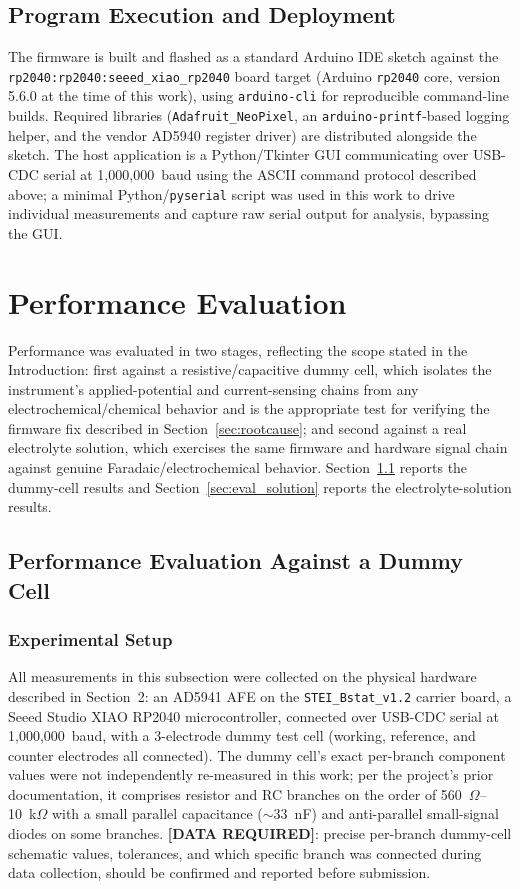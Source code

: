 \documentclass[preprint,12pt]{elsarticle}
\begin{document}
\subsection{Program Execution and Deployment}
The firmware is built and flashed as a standard Arduino IDE sketch against the \texttt{rp2040:rp2040:seeed\_xiao\_rp2040} board target (Arduino \texttt{rp2040} core, version 5.6.0 at the time of this work), using \texttt{arduino-cli} for reproducible command-line builds. Required libraries (\texttt{Adafruit\_NeoPixel}, an \texttt{arduino-printf}-based logging helper, and the vendor AD5940 register driver) are distributed alongside the sketch. The host application is a Python/Tkinter GUI communicating over USB-CDC serial at 1{,}000{,}000~baud using the ASCII command protocol described above; a minimal Python/\texttt{pyserial} script was used in this work to drive individual measurements and capture raw serial output for analysis, bypassing the GUI.

\section{Performance Evaluation}

Performance was evaluated in two stages, reflecting the scope stated in the Introduction: first against a resistive/capacitive dummy cell, which isolates the instrument's applied-potential and current-sensing chains from any electrochemical/chemical behavior and is the appropriate test for verifying the firmware fix described in Section~\ref{sec:rootcause}; and second against a real electrolyte solution, which exercises the same firmware and hardware signal chain against genuine Faradaic/electrochemical behavior. Section~\ref{sec:eval_dummy} reports the dummy-cell results and Section~\ref{sec:eval_solution} reports the electrolyte-solution results.

\subsection{Performance Evaluation Against a Dummy Cell}
\label{sec:eval_dummy}

\subsubsection{Experimental Setup}
\label{sec:setup_dummy}
All measurements in this subsection were collected on the physical hardware described in Section~2: an AD5941 AFE on the \texttt{STEI\_Bstat\_v1.2} carrier board, a Seeed Studio XIAO RP2040 microcontroller, connected over USB-CDC serial at 1{,}000{,}000~baud, with a 3-electrode dummy test cell (working, reference, and counter electrodes all connected). The dummy cell's exact per-branch component values were not independently re-measured in this work; per the project's prior documentation, it comprises resistor and RC branches on the order of 560~$\Omega$--10~k$\Omega$ with a small parallel capacitance ($\sim$33~nF) and anti-parallel small-signal diodes on some branches. \textbf{[DATA REQUIRED]}: precise per-branch dummy-cell schematic values, tolerances, and which specific branch was connected during data collection, should be confirmed and reported before submission.
\end{document}
